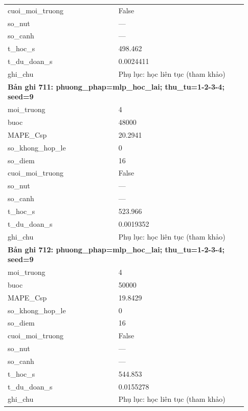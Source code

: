 \begin{longtable}{p{0.43\linewidth}p{0.50\linewidth}}
cuoi\_\allowbreak moi\_\allowbreak truong & False \\
so\_\allowbreak nut & — \\
so\_\allowbreak canh & — \\
t\_\allowbreak hoc\_\allowbreak s & 498.462 \\
t\_\allowbreak du\_\allowbreak doan\_\allowbreak s & 0.0024411 \\
ghi\_\allowbreak chu & Phụ lục: học liên tục (tham khảo) \\
\midrule
\multicolumn{2}{p{0.95\linewidth}}{\textbf{Bản ghi 711: phuong\_phap=mlp\_hoc\_lai; thu\_tu=1-2-3-4; seed=9}} \\
moi\_\allowbreak truong & 4 \\
buoc & 48000 \\
MAPE\_\allowbreak Csp & 20.2941 \\
so\_\allowbreak khong\_\allowbreak hop\_\allowbreak le & 0 \\
so\_\allowbreak diem & 16 \\
cuoi\_\allowbreak moi\_\allowbreak truong & False \\
so\_\allowbreak nut & — \\
so\_\allowbreak canh & — \\
t\_\allowbreak hoc\_\allowbreak s & 523.966 \\
t\_\allowbreak du\_\allowbreak doan\_\allowbreak s & 0.0019352 \\
ghi\_\allowbreak chu & Phụ lục: học liên tục (tham khảo) \\
\midrule
\multicolumn{2}{p{0.95\linewidth}}{\textbf{Bản ghi 712: phuong\_phap=mlp\_hoc\_lai; thu\_tu=1-2-3-4; seed=9}} \\
moi\_\allowbreak truong & 4 \\
buoc & 50000 \\
MAPE\_\allowbreak Csp & 19.8429 \\
so\_\allowbreak khong\_\allowbreak hop\_\allowbreak le & 0 \\
so\_\allowbreak diem & 16 \\
cuoi\_\allowbreak moi\_\allowbreak truong & False \\
so\_\allowbreak nut & — \\
so\_\allowbreak canh & — \\
t\_\allowbreak hoc\_\allowbreak s & 544.853 \\
t\_\allowbreak du\_\allowbreak doan\_\allowbreak s & 0.0155278 \\
ghi\_\allowbreak chu & Phụ lục: học liên tục (tham khảo) \\

\end{longtable}
